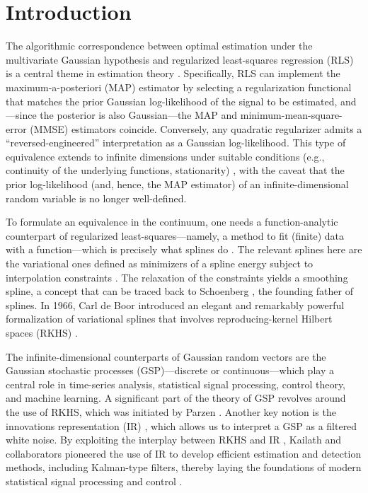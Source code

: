 \documentclass[11pt, english,english]{article}
\renewcommand{\[}{\begin{equation}}
\renewcommand{\]}[1]{\label{eq:#1}\end{equation}}
\begin{document}
\section{Introduction}
The algorithmic correspondence between optimal estimation under the multivariate Gaussian hypothesis and regularized least-squares regression (RLS) is a central theme in estimation theory \cite{Kailath2000linear}. 
Specifically, RLS can implement the maximum-a-posteriori (MAP) estimator by selecting a regularization functional that matches the prior Gaussian log-likelihood of the signal to be estimated, and---since the posterior is also Gaussian---the MAP and minimum-mean-square-error (MMSE) estimators coincide. Conversely, any quadratic regularizer admits a ``reversed-engineered'' interpretation as a Gaussian log-likelihood.
This type of equivalence extends to infinite dimensions under suitable conditions (e.g., continuity of the underlying functions, stationarity) \cite{Wahba1990,Berlinet2004}, with the caveat
that the prior log-likelihood (and, hence, the MAP estimator) of an infinite-dimensional random variable is no longer well-defined.

To formulate an equivalence in the continuum, one needs a function-analytic counterpart of regularized least-squares---namely, a method to fit (finite) data with a function---which is precisely what splines do \cite{Schumaker1981}. The relevant splines here are the variational ones defined as minimizers of a spline energy subject to interpolation constraints \cite{Prenter:1975}. The relaxation of the constraints  yields a smoothing spline, a concept that can be traced back to Schoenberg \cite{Schoenberg1964}, the founding father of splines. In 1966, Carl de Boor 
introduced an elegant and remarkably powerful formalization of variational splines \cite{deBoor1966} that involves reproducing-kernel Hilbert spaces (RKHS) \cite{Aronszajn1950}.

The infinite-dimensional counterparts of Gaussian random vectors are the Gaussian stochastic processes (GSP)---discrete or continuous---which play a central role in time-series analysis, statistical signal processing, control theory, and machine learning. A significant part of the theory of GSP revolves around the use of RKHS, which was initiated by Parzen \cite{Parzen1961}. 
Another key notion is the innovations representation (IR) \cite{Kailath1970}, which allows us to interpret a GSP as a filtered white noise.
By exploiting the interplay between RKHS and IR \cite{Kailath1972}, Kailath and collaborators pioneered the use of IR to develop efficient estimation and detection methods, including Kalman-type filters, thereby laying the foundations of modern statistical signal processing and control \cite{Kailath1974}.
\end{document}
